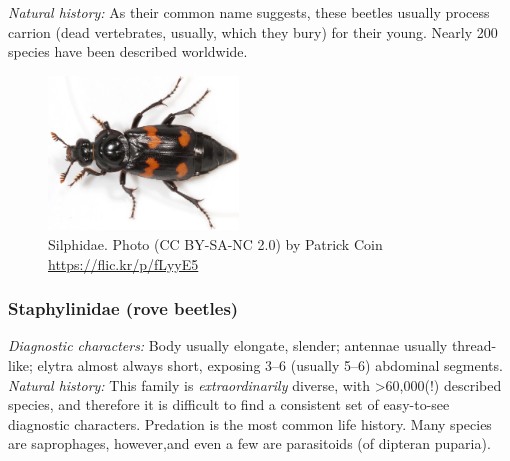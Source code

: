 \documentclass[letterpaper, 11pt]{article}
\begin{document}
\noindent{}\textit{Natural history:} As their common name suggests, these beetles usually process carrion (dead vertebrates, usually, which they bury) for their young. Nearly 200 species have been described worldwide.

\begin{figure}[ht!]
  \centering
    \includegraphics[width=0.45\textwidth]{SilphidaeHabitus}
  \caption{Silphidae. Photo (CC BY-SA-NC 2.0) by Patrick Coin \url{https://flic.kr/p/fLyyE5}}
  \label{fig:silphid}
\end{figure}

\subsubsection{Staphylinidae (rove beetles)}
\noindent{}\textit{Diagnostic characters:} Body usually elongate, slender; antennae usually thread-like; elytra almost always short, exposing 3--6 (usually 5--6) abdominal segments.\\

\noindent{}\textit{Natural history:} This family is \textit{extraordinarily} diverse, with \textgreater60,000(!) described species, and therefore it is difficult to find a consistent set of easy-to-see diagnostic characters. Predation is the most common life history. Many species are saprophages, however,and even a few are parasitoids (of dipteran puparia).
\end{document}
